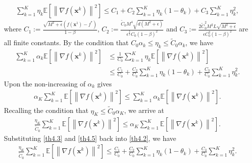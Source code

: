 \documentclass[twoside,11pt]{article}
\begin{document}
\begin{equation}
	\begin{aligned}
		\sum_{k=1}^{K}\eta_k\mathbb{E}\left[\left\| \nabla f(\mathbf{x}^k)\right\|^2\right]
		\le C_1
		+C_2\sum_{k=1}^{K}\eta_k(1-\theta_k)+C_3 \sum_{k=1}^{K}\eta_{k}^2,
		\nonumber
	\end{aligned}
\end{equation}
where $C_1:=\frac{\sqrt{M^2+\epsilon}\left( f(\mathbf{x}^1)-f^*\right) }{1-\beta}$, $
C_2:=\frac{\tilde{C}_0 M^4\sqrt{d(M^2+\epsilon)}}{\epsilon^{\frac{3}{2}}C_0(1-\beta)^2}$ and $
C_3:=\frac{2\tilde{C}_0^2 M^2L\sqrt{M^2+\epsilon}}{\epsilon C_0^2(1-\beta)^2}$ are all finite constants. By the condition that $C_{0}\alpha_{k}\leq \eta_{k}\leq \widetilde{C}_{0}\alpha_{k}$, we have
\begin{equation}\label{th4.2}
   	\begin{aligned}
   	\sum_{k=1}^{K}\alpha_k\mathbb{E}\left[\left\| \nabla f(\mathbf{x}^k)\right\|^2\right]
   	&\le\frac{1}{C_0}\sum_{k=1}^{K}\eta_k\mathbb{E}\left[\left\| \nabla f(\mathbf{x}^k)\right\|^2\right]\\
   	&\le \frac{C_1}{C_0}
   	+\frac{C_2}{C_0}\sum_{k=1}^{K}\eta_k{(1-\theta_k)}+\frac{C_3}{C_0} \sum_{k=1}^{K}\eta_{k}^2.
   	\end{aligned}
\end{equation}
Upon the non-increasing of $\alpha_k$ gives
\begin{equation}\label{th4.3}
   	\begin{aligned}
   	\alpha_K\sum_{k=1}^{K}\mathbb{E}\left[\left\| \nabla f(\mathbf{x}^k)\right\|^2\right]
   	\le\sum_{k=1}^{K}\alpha_k\mathbb{E}\left[\left\| \nabla f(\mathbf{x}^k)\right\|^2\right].
   	\end{aligned}
\end{equation}
Recalling the condition that  $\eta_{K}\le\tilde{C}_0\alpha_K$, we arrive at
\begin{equation}\label{th4.5}
   	\begin{aligned}
   	\frac{\eta_K}{\tilde{C}_0}\sum_{k=1}^{K}\mathbb{E}\left[\left\| \nabla f(\mathbf{x}^k)\right\|^2\right]
   	\le\alpha_K\sum_{k=1}^{K}\mathbb{E}\left[\left\| \nabla f(\mathbf{x}^k)\right\|^2\right]
   	.
   	\end{aligned}
\end{equation}
Substituting \eqref{th4.3} and \eqref{th4.5} back into \eqref{th4.2}, we have
\begin{equation}\label{th4.4}
   	\begin{aligned}
   	\frac{\eta_K}{\tilde{C}_0}\sum_{k=1}^{K}\mathbb{E}\left[\left\| \nabla f(\mathbf{x}^k)\right\|^2\right]
   	\le \frac{C_1}{C_0}
   	+\frac{C_2}{C_0}\sum_{k=1}^{K}\eta_k{(1-\theta_k)}+\frac{C_3}{C_0} \sum_{k=1}^{K}\eta_{k}^2.
   	\end{aligned}
\end{equation}
\end{document}

